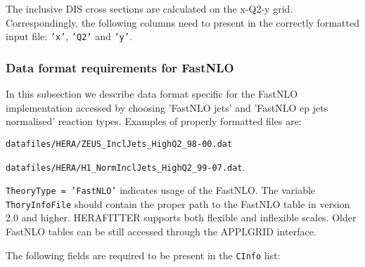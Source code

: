 The inclusive DIS cross sections are calculated on the x-Q2-y grid. Correspondingly,
the following columns need to present in the correctly formatted input file: 
{\tt 'x'}, {\tt 'Q2'} and {\tt 'y'}.


\subsubsection{Data format requirements for FastNLO}

In this subsection we describe data format specific for the FastNLO implementation
accessed by choosing 'FastNLO jets' and 'FastNLO ep jets normalised' reaction types.
Examples of properly formatted files are:

   {\tt datafiles/HERA/ZEUS\_InclJets\_HighQ2\_98-00.dat}

   {\tt datafiles/HERA/H1\_NormInclJets\_HighQ2\_99-07.dat}.

{\tt TheoryType = 'FastNLO'} indicates usage of the FastNLO. The variable {\tt ThoryInfoFile} 
should contain the proper path to the FastNLO table in version 2.0 and higher.
HERAFITTER supports both flexible and inflexible scales.
Older FastNLO tables can be still accessed through the APPLGRID interface.

The following fields are required to be present in the {\tt CInfo} list:

